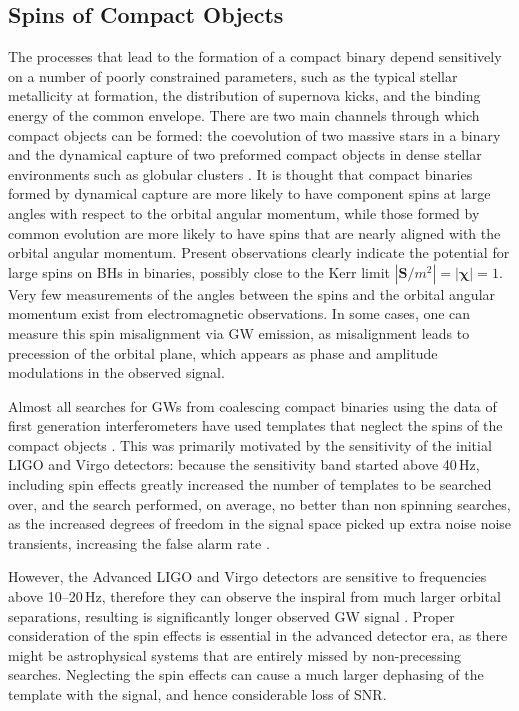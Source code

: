 \documentclass[binding=0.6cm, LaM]{sapthesis}
\begin{document}
\subsection{Spins of Compact Objects}
	The processes that lead to the formation of a compact binary
	depend sensitively on a number of poorly constrained parameters, 
	such as the typical stellar metallicity at formation, 
	the distribution of supernova kicks, 
	and the binding energy of the common envelope. 
	There are two main channels through which compact objects can be formed:
	the coevolution of two massive stars in a binary and 
	the dynamical capture of two preformed compact objects 
	in dense stellar environments such as globular clusters \cite{37}.	
	It is thought that compact binaries formed by dynamical capture 
	are more likely to have component spins
	at large angles with respect to the orbital angular momentum, 
	while those formed by common evolution are more likely to have 
	spins that are nearly aligned with the orbital angular momentum.
	Present observations clearly indicate the potential for large spins 
	on BHs in binaries, possibly close to the Kerr limit $|\mathbf{S}/m^2| = |\mathbf{\chi}| = 1$.
	Very few measurements of the angles between the spins and 
	the orbital angular momentum exist from electromagnetic observations. 
	In some cases, one can measure this spin misalignment via GW emission, 
	as misalignment leads to precession of the orbital plane, 
	which appears as phase and amplitude modulations in the observed signal.

	Almost all searches for GWs from coalescing compact binaries 
	using the data of first generation interferometers 
	have used templates that neglect the spins of the compact objects \cite{32}.
	This was primarily motivated by the sensitivity of the initial LIGO and Virgo detectors:
	because the sensitivity band started above 40\,Hz, 
	including spin effects greatly increased the number of templates to be searched over, 
	and the search performed, on average, no better than non spinning searches, 	
	as the increased degrees of freedom in the signal space picked up extra noise noise transients, 	
	increasing the false alarm rate \cite{32, 38}.

	However, the Advanced LIGO and Virgo detectors are sensitive to frequencies above 10--20\,Hz, 
	therefore they can observe the inspiral from much larger orbital separations, 
	resulting is significantly longer observed GW signal \cite{23}. 
	Proper consideration of the spin effects is essential in the advanced detector era, 
	as there might be astrophysical systems that are entirely missed by non-precessing searches.
	Neglecting the spin effects can cause a much larger dephasing of the template with the signal, 
	and hence considerable loss of SNR. 
\end{document}
